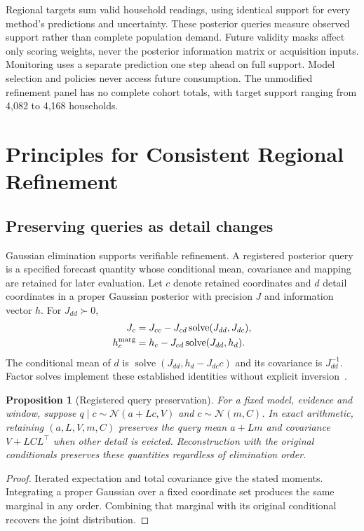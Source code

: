\documentclass[conference]{IEEEtran}
\newtheorem{proposition}{Proposition}
\begin{document}
Regional targets sum valid household readings, using identical support for every method's predictions and uncertainty. These posterior queries measure observed support rather than complete population demand. Future validity masks affect only scoring weights, never the posterior information matrix or acquisition inputs. Monitoring uses a separate prediction one step ahead on full support. Model selection and policies never access future consumption. The unmodified refinement panel has no complete cohort totals, with target support ranging from 4,082 to 4,168 households.








\section{Principles for Consistent Regional Refinement}
\subsection{Preserving queries as detail changes}
Gaussian elimination supports verifiable refinement. A registered posterior query is a specified forecast quantity whose conditional mean, covariance and mapping are retained for later evaluation. Let $c$ denote retained coordinates and $d$ detail coordinates in a proper Gaussian posterior with precision $J$ and information vector $h$. For $J_{dd}\succ0$,
\begin{align}
J_c&=J_{cc}-J_{cd}\operatorname{solve}(J_{dd},J_{dc}),\label{eq:schur}\\
h_c^{\rm marg}&=h_c-J_{cd}\operatorname{solve}(J_{dd},h_d).
\end{align}
The conditional mean of $d$ is $\operatorname{solve}(J_{dd},h_d-J_{dc}c)$ and its covariance is $J_{dd}^{-1}$. Factor solves implement these established identities without explicit inversion~\cite{distributed,isam}.

\begin{proposition}[Registered query preservation]
For a fixed model, evidence and window, suppose
$q\mid c\sim\mathcal N(a+Lc,V)$ and $c\sim\mathcal N(m,C)$. In exact arithmetic, retaining $(a,L,V,m,C)$ preserves the query mean $a+Lm$ and covariance $V+LCL^\top$ when other detail is evicted. Reconstruction with the original conditionals preserves these quantities regardless of elimination order.
\end{proposition}
\begin{proof}
Iterated expectation and total covariance give the stated moments. Integrating a proper Gaussian over a fixed coordinate set produces the same marginal in any order. Combining that marginal with its original conditional recovers the joint distribution.
\end{proof}
\end{document}
